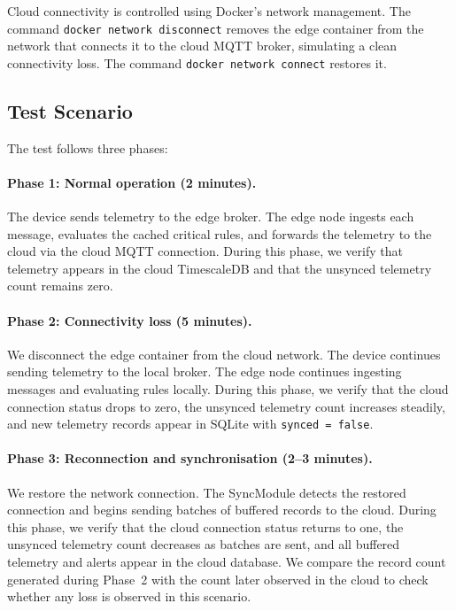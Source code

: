 Cloud connectivity is controlled using Docker's network management. The command \texttt{docker network disconnect} removes the edge container from the network that connects it to the cloud \gls{MQTT} broker, simulating a clean connectivity loss. The command \texttt{docker network connect} restores it.

\subsection{Test Scenario}
\label{subsec:EvalOfflineScenario}

The test follows three phases:

\paragraph{Phase 1: Normal operation (2 minutes).}
The device sends telemetry to the edge broker. The edge node ingests each message, evaluates the cached critical rules, and forwards the telemetry to the cloud via the cloud \gls{MQTT} connection. During this phase, we verify that telemetry appears in the cloud TimescaleDB and that the unsynced telemetry count remains zero.

\paragraph{Phase 2: Connectivity loss (5 minutes).}
We disconnect the edge container from the cloud network. The device continues sending telemetry to the local broker. The edge node continues ingesting messages and evaluating rules locally. During this phase, we verify that the cloud connection status drops to zero, the unsynced telemetry count increases steadily, and new telemetry records appear in SQLite with \texttt{synced = false}.

\paragraph{Phase 3: Reconnection and synchronisation (2--3 minutes).}
We restore the network connection. The SyncModule detects the restored connection and begins sending batches of buffered records to the cloud. During this phase, we verify that the cloud connection status returns to one, the unsynced telemetry count decreases as batches are sent, and all buffered telemetry and alerts appear in the cloud database. We compare the record count generated during Phase~2 with the count later observed in the cloud to check whether any loss is observed in this scenario.

